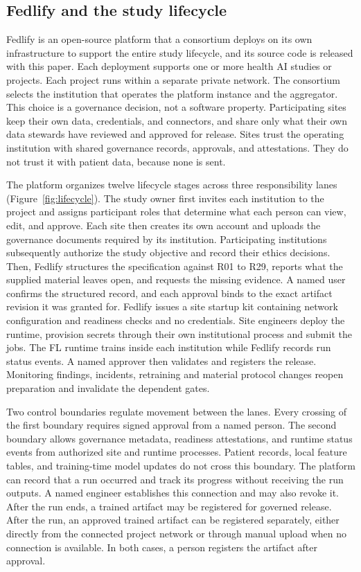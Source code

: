 \documentclass[preprint,5p, 10pt, times]{elsarticle}
\begin{document}
\subsection*{Fedlify and the study lifecycle}

Fedlify is an open-source platform that a consortium deploys on its own infrastructure to support the entire study lifecycle, and its source code is released with this paper.
%
Each deployment supports one or more health AI studies or projects. Each project runs within a separate private network. The consortium selects the institution that operates the platform instance and the aggregator. This choice is a governance decision, not a software property. 
Participating sites keep their own data, credentials, and connectors, and share only what their own data stewards have reviewed and approved for release. 
%
Sites trust the operating institution with shared governance records, approvals, and attestations. They do not trust it with patient data, because none is sent. 

The platform organizes twelve lifecycle stages across three responsibility lanes (Figure~\ref{fig:lifecycle}). 
The study owner first invites each institution to the project and assigns participant roles that determine what each person can view, edit, and approve. Each site then creates its own account and uploads the governance documents required by its institution. Participating institutions subsequently authorize the study objective and record their ethics decisions.
%
Then, Fedlify structures the specification against R01 to R29, reports what the supplied material leaves open, and requests the missing evidence. A named user confirms the structured record, and each approval binds to the exact artifact revision it was granted for. 
%
Fedlify issues a site startup kit containing network configuration and readiness checks and no credentials. 
%
Site engineers deploy the runtime, provision secrets through their own institutional process and submit the jobs. 
%
The FL runtime trains inside each institution while Fedlify records run status events. 
A named approver then validates and registers the release. 
Monitoring findings, incidents, retraining and material protocol changes reopen preparation and invalidate the dependent gates.


Two control boundaries regulate movement between the lanes. Every crossing of the first boundary requires signed approval from a named person. 
%
The second boundary allows governance metadata, readiness attestations, and runtime status events from authorized site and runtime processes. Patient records, local feature tables, and training-time model updates do not cross this boundary. The platform can record that a run occurred and track its progress without receiving the run outputs. A named engineer establishes this connection and may also revoke it. After the run ends, a trained artifact may be registered for governed release. 
After the run, an approved trained artifact can be registered separately, either directly from the connected project network or through manual upload when no connection is available.
In both cases, a person registers the artifact after approval.
\end{document}
